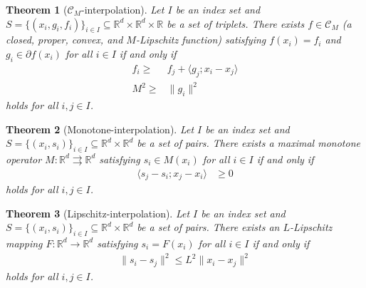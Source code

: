 \documentclass[11pt,a4paper]{article}
\newtheorem{theorem}{Theorem}
\begin{document}
	\begin{theorem}[$\mathcal{C}_M$-interpolation]\label{thm:interp_Lipschitzfunc} Let $I$ be an index set and $S=\{(x_i,g_i,f_i)\}_{i\in I}\subseteq \mathbb{R}^d\times\mathbb{R}^d\times \mathbb{R}$ be a set of triplets. There exists $f\in\mathcal{C}_{M}$ (a closed, proper, convex, and $M$-Lipschitz function) satisfying $f(x_i)=f_i$ and $g_i\in\partial f(x_i)$ for all $i\in I$ if and only if
\begin{equation*}
\begin{aligned}
f_i\geqslant& f_j+\langle g_j;x_i-x_j\rangle\\
M^2\geqslant & \|g_i\|^2
\end{aligned}
\end{equation*}
holds for all $i,j\in I$.
	\end{theorem}
	
	
\begin{theorem}[Monotone-interpolation]\label{thm:monotone_interpolation} Let $I$ be an index set and $S=\{(x_i,s_i)\}_{i\in I}\subseteq \mathbb{R}^d\times\mathbb{R}^d$ be a set of pairs. There exists a maximal monotone operator $M:\mathbb{R}^d\rightrightarrows\mathbb{R}^d$ satisfying $s_i\in M(x_i)$ for all $i\in I$ if and only if
\begin{equation*}
\begin{aligned}
\langle s_j-s_i;x_j-x_i\rangle&\geqslant 0
\end{aligned}
\end{equation*}
holds for all $i,j\in I$.
\end{theorem}

\begin{theorem}[Lipschitz-interpolation]\label{thm:Lipschitz_interpolation} Let $I$ be an index set and $S=\{(x_i,s_i)\}_{i\in I}\subseteq \mathbb{R}^d\times\mathbb{R}^d$ be a set of pairs. There exists an $L$-Lipschitz mapping $F:\mathbb{R}^d\rightarrow\mathbb{R}^d$ satisfying $s_i= F(x_i)$ for all $i\in I$ if and only if
\begin{equation*}
\begin{aligned}
\|s_i-s_j\|^2\leqslant L^2 \|x_i-x_j\|^2
\end{aligned}
\end{equation*}
holds for all $i,j\in I$.
\end{theorem}
\end{document}
